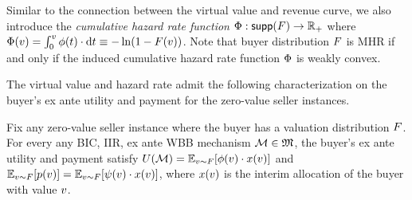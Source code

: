 Similar to the connection between the virtual value and revenue curve, we also introduce the \emph{cumulative hazard rate function} $\Phi:{\sf supp}(F)\rightarrow \mathbb{R}_+$ where $\Phi(v) = \int_{0}^v \phi(t)\cdot \mathrm{d} t \equiv -\ln(1 - F(v))$. Note that buyer distribution $F$ is MHR if and only if the induced cumulative hazard rate function $\Phi$ is weakly convex. 

The virtual value and hazard rate admit the following characterization on the buyer's ex ante utility and payment for the zero-value seller instances.
\begin{proposition}
\label{prop:revenue equivalence}
\label{prop:buyer surplus equivalence}
\begin{flushleft}
{Fix any zero-value seller instance where the buyer has a valuation distribution $F$. For every any BIC, IIR, ex ante WBB mechanism $\mathcal{M} \in\mathfrak{M}$,} the buyer's ex ante utility and payment satisfy 
$\buyerexanteutil(\mech)
= 
\expect[\val\sim\buyerdist]{\buyerhazardrate(\val)\cdot \alloc(\val)}$
and 
$\expect[\val\sim\buyerdist]{\price(\val)}
= 
\expect[\val\sim\buyerdist]{\virtualval(\val)\cdot \alloc(\val)}$,
where $x(v)$ is the interim allocation of the buyer with value $v$.
\end{flushleft}
\end{proposition}